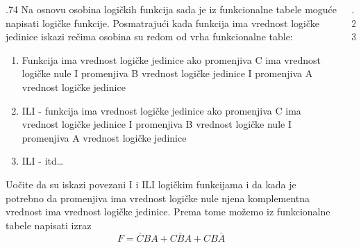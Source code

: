 \begin{frame}[label=02-s013]
\gusttekst
\begin{columns}[c,onlytextwidth]
\begin{column}{.74\textwidth}
Na osnovu osobina logičkih funkcija sada je iz funkcionalne tabele moguće napisati logičke funkcije. Posmatrajući kada funkcija ima vrednost logičke jedinice iskazi rečima osobina su redom od vrha funkcionalne table:
\begin{enumerate}
\item Funkcija ima vrednost logičke jedinice ako promenjiva C ima vrednost logičke nule I promenjiva B vrednost logičke jedinice I promenjiva A vrednost logičke jedinice
\item ILI - funkcija ima vrednost logičke jedinice ako promenjiva C ima vrednost logičke jedinice I promenjiva B vrednost logičke nule I promenjiva A vrednost logičke jedinice
\item ILI - itd\ldots
\end{enumerate}
Uočite da su iskazi povezani I i ILI logičkim funkcijama i da kada je potrebno da promenjiva ima vrednost logičke nule njena komplementna vrednost ima vrednost logičke jedinice. Prema tome možemo iz funkcionalne tabele napisati izraz
\[
F=\bar CBA+C\bar BA+CB\bar A
\]
\end{column}
\begin{column}{.23\textwidth}

\end{column}
\end{columns}
\end{frame}
